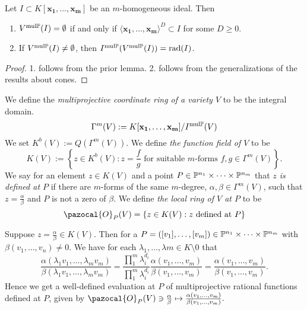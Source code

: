         \begin{theorem}
            Let $I\subset K[\mathbf{x_1},\dots,\mathbf{x_m}]$ be an $m$-homogeneous ideal. Then
            \begin{enumerate}
                \item $V^{\mathrm{mul}\mathbb{P}}(I)=\emptyset $ if and only if $\langle \mathbf{x_1},\dots,\mathbf{x_m}\rangle ^D\subset I$ for some $D\geq 0$.
                \item If $V^{\mathrm{mul}\mathbb{P}}(I)\neq \emptyset$, then $I^{\mathrm{mul}\mathbb{P}}(V^{\mathrm{mul}\mathbb{P}}(I))=\mathrm{rad}(I)$.
        \end{enumerate}
        \end{theorem}
        \begin{proof}
            1. follows from the prior lemma. 2. follows from the generalizations of the results about cones.
        \end{proof}
        \begin{definition}
            We define the \textit{multiprojective coordinate ring of a variety $V$} to be the integral domain. 
            $$\Gamma^m(V):= K[\mathbf{x_1},\dots,\mathbf{x_m}]/I^{\mathrm{mul}\mathbb{P}}(V)$$
            We set $K^b(V):=Q(\Gamma^m(V))$. We define \textit{the function field of $V$} to be 
            $$K(V) := \left\{z \in K^b(V): z = \frac{f}{g} \text{ for suitable $m$-forms } f,g\in \Gamma^m(V)\right\}.$$
            We say for an element $z\in K(V)$ and a point $P\in \mathbb{P}^{n_1}\times \cdots \times \mathbb{P}^{n_m}$ that \textit{$z$ is defined at $P$} if there are $m$-forms of the same $m$-degree, $\alpha,\beta\in \Gamma^m(V)$, such that $z=\frac{\alpha}{\beta}$ and $P$ is not a zero of $\beta$. We define \textit{the local ring of $V$ at $P$} to be 
            $$\pazocal{O}_P(V)= \left\{z\in K(V) : z \text{ defined at } P \right\}$$
        \end{definition}
        \begin{remark}
            Suppose $z=\frac{\alpha}{\beta}\in K(V)$. Then for a $P=([v_1],\dots,[v_m])\in \mathbb{P}^{n_1}\times \cdots \times \mathbb{P}^{n_m}$ with $\beta(v_1,\dots,v_n)\neq 0$. We have for each $\lambda_1,\dots,\lambda m\in K\setminus 0$ that 
            $$\frac{\alpha(\lambda_1v_1,\dots,\lambda_mv_m)}{\beta(\lambda_1v_1,\dots,\lambda_mv_m)}= \frac{\prod_1^m \lambda_i^{d_i}}{\prod_1^m \lambda_i^{d_i}}\frac{\alpha(v_1,\dots,v_m)}{\beta(v_1,\dots,v_m)} = \frac{\alpha(v_1,\dots,v_m)}{\beta(v_1,\dots,v_m)}.$$
            Hence we get a well-defined evaluation at $P$ of multiprojective rational functions defined at $P$, given by $\pazocal{O}_P(V)\ni\frac{\alpha}{\beta}\mapsto \frac{\alpha(v_1,\dots,v_m)}{\beta(v_1,\dots,v_m)}.$ 
        \end{remark}
